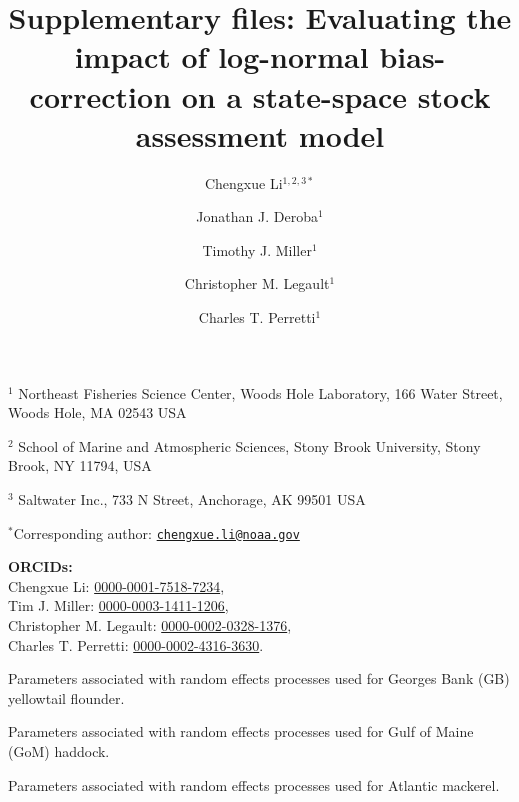 \documentclass[
  12pt,
]{article}
\title{Supplementary files: Evaluating the impact of log-normal
bias-correction on a state-space stock assessment model}
\author{Chengxue Li\(^{1,2,3*}\) \and Jonathan J.
Deroba\(^1\) \and Timothy J. Miller\(^1\) \and Christopher M.
Legault\(^1\) \and Charles T. Perretti\(^1\)}
\date{}
\begin{document}
\maketitle

\(^1\) Northeast Fisheries Science Center, Woods Hole Laboratory, 166
Water Street, Woods Hole, MA 02543 USA

\(^2\) School of Marine and Atmospheric Sciences, Stony Brook
University, Stony Brook, NY 11794, USA

\(^3\) Saltwater Inc., 733 N Street, Anchorage, AK 99501 USA

\(^*\)Corresponding author:
\href{mailto:chengxue.li@noaa.gov}{\nolinkurl{chengxue.li@noaa.gov}}

\vspace{0.5cm}

\textbf{ORCIDs:}\\
Chengxue Li:
\href{https://orcid.org/0000-0001-7518-7234}{0000-0001-7518-7234},\\
Tim J. Miller:
\href{https://orcid.org/0000-0003-1411-1206}{0000-0003-1411-1206},\\
Christopher M. Legault:
\href{https://orcid.org/0000-0002-0328-1376}{0000-0002-0328-1376},\\
Charles T. Perretti:
\href{https://orcid.org/0000-0002-4316-3630}{0000-0002-4316-3630}.

\pagebreak

\renewcommand{\thetable}{S\arabic{table}}
\setcounter{table}{0}

\begin{table}[H]
    \centering
    \caption{Parameters associated with random effects processes used for Georges Bank (GB) yellowtail flounder.}
    \label{supp_flounder_table}
    
\end{table}

\begin{table}[H]
    \centering
    \caption{Parameters associated with random effects processes used for Gulf of Maine (GoM) haddock.}
    \label{supp_haddock_table}
    
\end{table}

\begin{table}[H]
    \centering
    \caption{Parameters associated with random effects processes used for Atlantic mackerel.}
    \label{supp_mackerel_table}
    
\end{table}
\end{document}
